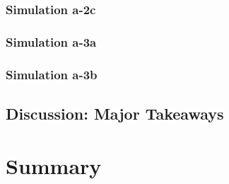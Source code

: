 
\subsubsection{Simulation a-2c}

\subsubsection{Simulation a-3a}

\subsubsection{Simulation a-3b}

\subsection{Discussion: Major Takeaways}

\section{Summary}

